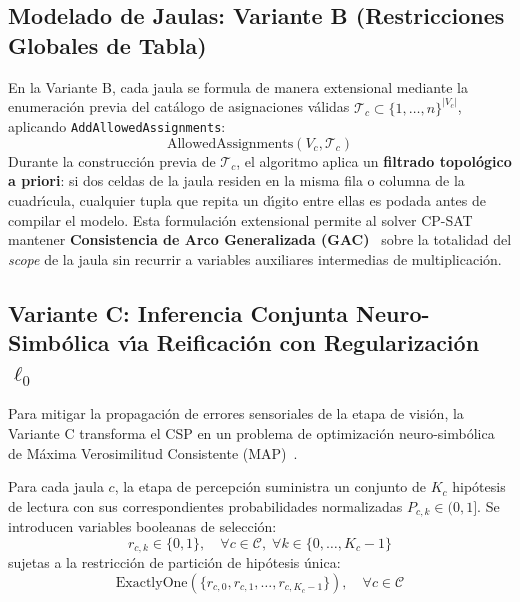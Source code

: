 \subsection{Modelado de Jaulas: Variante B (Restricciones Globales de Tabla)}
En la Variante B, cada jaula se formula de manera extensional mediante la enumeraci\'on previa del cat\'alogo de asignaciones v\'alidas $\mathcal{T}_c \subset \{1, \dots, n\}^{|V_c|}$, aplicando \texttt{AddAllowedAssignments}:
\begin{equation}
    \text{AllowedAssignments}(V_c, \mathcal{T}_c)
    \label{eq:table_constraint}
\end{equation}
Durante la construcci\'on previa de $\mathcal{T}_c$, el algoritmo aplica un \textbf{filtrado topol\'ogico a priori}: si dos celdas de la jaula residen en la misma fila o columna de la cuadr\'{\i}cula, cualquier tupla que repita un d\'{\i}gito entre ellas es podada antes de compilar el modelo. Esta formulaci\'on extensional permite al solver CP-SAT mantener \textbf{Consistencia de Arco Generalizada (GAC)}~\cite{bessiere2006table} sobre la totalidad del \textit{scope} de la jaula sin recurrir a variables auxiliares intermedias de multiplicaci\'on.

\subsection{Variante C: Inferencia Conjunta Neuro-Simb\'olica v\'{\i}a Reificaci\'on con Regularizaci\'on \texorpdfstring{$\ell_0$}{L0}}
\label{sec:joint_inference}
Para mitigar la propagaci\'on de errores sensoriales de la etapa de visi\'on, la Variante C transforma el CSP en un problema de optimizaci\'on neuro-simb\'olica de M\'axima Verosimilitud Consistente (MAP)~\cite{deraedt2011constraint}.

Para cada jaula $c$, la etapa de percepci\'on suministra un conjunto de $K_c$ hip\'otesis de lectura con sus correspondientes probabilidades normalizadas $P_{c,k} \in (0, 1]$. Se introducen variables booleanas de selecci\'on:
\begin{equation}
    r_{c,k} \in \{0, 1\}, \quad \forall c \in \mathcal{C}, \; \forall k \in \{0, \dots, K_c - 1\}
\end{equation}
sujetas a la restricci\'on de partici\'on de hip\'otesis \'unica:
\begin{equation}
    \text{ExactlyOne}(\{r_{c,0}, r_{c,1}, \dots, r_{c,K_c - 1}\}), \quad \forall c \in \mathcal{C}
\end{equation}

